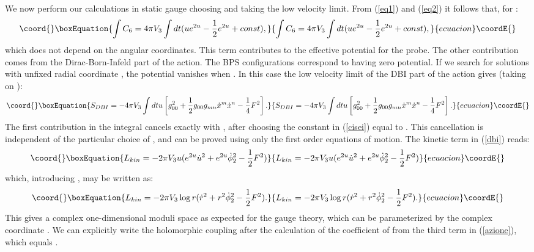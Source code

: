 \documentclass[a4paper,12pt]{article}
\begin{document}
We  now perform our calculations in static gauge choosing
\coordHE{} and taking the low velocity limit. From (\ref{eq1}) and (\ref{eq2}) it follows that, for \coordHE{} :
\begin{equation}\coord{}\boxEquation{
\int C_{6}=4\pi V_{3}\int dt (ue^{2u}-{1\over2}e^{2u}+const),
\label{cisei}
}{
\int C_{6}=4\pi V_{3}\int dt (ue^{2u}-{1\over2}e^{2u}+const),
}{ecuacion}\coordE{}\end{equation}
which does not depend on the angular coordinates. This term contributes to the effective potential for the probe. The other contribution comes 
from the Dirac-Born-Infeld part of the action. 
The BPS 
configurations correspond to having zero potential. If we search for solutions with unfixed radial coordinate \coordHE{}, the potential vanishes when \coordHE{}. In this case the low velocity limit of the DBI part of the action gives (taking \coordHE{} on \coordHE{}):
\begin{equation}\coord{}\boxEquation{
S_{DBI}= -4\pi V_{3}\int dt u\left[g^{2}_{00}+{1\over2}g_{00}g_{mn}\dot{x}^{m}\dot{x}^{n}-{1\over4}F^{2}\right].
\label{dbi}
}{
S_{DBI}= -4\pi V_{3}\int dt u\left[g^{2}_{00}+{1\over2}g_{00}g_{mn}\dot{x}^{m}\dot{x}^{n}-{1\over4}F^{2}\right].
}{ecuacion}\coordE{}\end{equation}
The first contribution in the integral cancels exactly with \coordHE{}, after choosing the constant in (\ref{cisei}) equal to \coordHE{}. This cancellation is independent of the particular
 choice of \coordHE{}, and can be proved using only the first order equations of
motion. The kinetic term in (\ref{dbi}) reads:
\begin{equation}\coord{}\boxEquation{
L_{kin}= -2\pi V_{3}u(e^{2u}{\dot{u}}^{2}+e^{2u}\dot{\phi}_{2}^{2}- {1\over2}F^2)
}{
L_{kin}= -2\pi V_{3}u(e^{2u}{\dot{u}}^{2}+e^{2u}\dot{\phi}_{2}^{2}- {1\over2}F^2)
}{ecuacion}\coordE{}\end{equation}
which, introducing \coordHE{}, may be written as:
\begin{equation}\coord{}\boxEquation{
L_{kin}= -2\pi V_{3}\log r({\dot{r}}^{2}+ r^{2}\dot{\phi}_{2}^{2}- {1\over2}F^2).
}{
L_{kin}= -2\pi V_{3}\log r({\dot{r}}^{2}+ r^{2}\dot{\phi}_{2}^{2}- {1\over2}F^2).
}{ecuacion}\coordE{}\end{equation}
This gives a complex one-dimensional moduli space as expected for the \coordHE{} gauge theory, which can be parameterized by the complex coordinate \coordHE{}. We can explicitly write the holomorphic coupling after the calculation of the coefficient of \coordHE{} from the third term in (\ref{azione}), which equals \coordHE{}.
\end{document}
